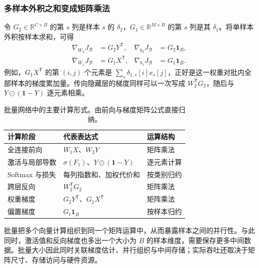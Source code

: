 \subsubsection{多样本外积之和变成矩阵乘法}
令 $G_2\in\mathbb{R}^{C\times B}$ 的第 $s$ 列是样本 $s$ 的 $\delta_2$，$G_1\in\mathbb{R}^{M\times B}$ 的第 $s$ 列是其 $\delta_1$。将单样本外积按样本求和，可得
\begin{align}
 \nabla_{W_2}J_{\mathcal B}&=G_2Y^{\mathsf T},&
 \nabla_{b_2}J_{\mathcal B}&=G_2\mathbf{1}_B,\\
 \nabla_{W_1}J_{\mathcal B}&=G_1X^{\mathsf T},&
 \nabla_{b_1}J_{\mathcal B}&=G_1\mathbf{1}_B.
 \label{l10:eq:batch-gradients}
\end{align}
例如，$G_1X^{\mathsf T}$ 的第 $(i,j)$ 个元素是 $\sum_s\delta_{1,s}[i]x_s[j]$，正好是这一权重对批内全部样本的梯度累加量。传向隐藏层的梯度同样可以一次写成 $W_2^{\mathsf T}G_2$，随后与 $Y\odot(\mathbf{1}-Y)$ 逐元素相乘。

\begin{table}[H]
\centering
\caption{批量网络中的主要计算形式。由前向与梯度矩阵公式直接归纳。}
\begin{tabularx}{\linewidth}{lYY}
\toprule
计算阶段 & 代表表达式 & 运算结构\\
\midrule
全连接前向 & $W_1X$、$W_2Y$ & 矩阵乘法\\
激活与局部导数 & $\sigma(F_1)$、$Y\odot(\mathbf{1}-Y)$ & 逐元素计算\\
Softmax 与损失 & 每列指数和、加权代价和 & 按类别归约\\
跨层反向 & $W_2^{\mathsf T}G_2$ & 矩阵乘法\\
权重梯度 & $G_2Y^{\mathsf T}$、$G_1X^{\mathsf T}$ & 矩阵乘法\\
偏置梯度 & $G_\ell\mathbf{1}_B$ & 按样本归约\\
\bottomrule
\end{tabularx}
\end{table}

批量把多个向量计算组织到同一个矩阵运算中，从而暴露样本之间的并行性。与此同时，激活值和反向梯度也多出一个大小为 $B$ 的样本维度，需要保存更多中间数据。批量大小因此同时关联梯度估计、并行组织与中间存储；实际吞吐还取决于矩阵尺寸、存储访问与硬件资源。
